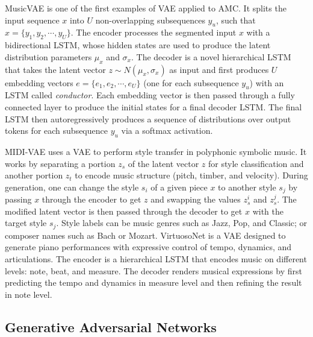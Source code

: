 MusicVAE \cite{Roberts2017} is one of the first examples of VAE applied to AMC. It splits the input sequence $x$ into $U$ non-overlapping subsequences $y_u$, such that $x = \{y_1, y_2, \cdots, y_U\}$. The encoder processes the segmented input $x$ with a bidirectional LSTM, whose hidden states are used to produce the latent distribution parameters $\mu_x$ and $\sigma_x$. The decoder is a novel hierarchical LSTM that takes the latent vector $z \sim N(\mu_x, \sigma_x)$ as input and first produces $U$ embedding vectors $e = \{e_1, e_2, \cdots, e_U\}$ (one for each subsequence $y_u$) with an LSTM called \textit{conductor}. Each embedding vector is then passed through a  fully connected layer to produce the initial states for a final decoder LSTM. The final LSTM then autoregressively produces a sequence of distributions over output tokens for each subsequence $y_u$ via a softmax activation.

MIDI-VAE \cite{brunner2018midi} uses a VAE to perform style transfer in polyphonic symbolic music. It works by separating a portion $z_s$ of the latent vector $z$ for style classification and another portion $z_t$ to encode music structure (pitch, timber, and velocity). During generation, one can change the style $s_i$ of a given piece $x$ to another style $s_j$ by passing $x$ through the encoder to get $z$ and swapping the values $z_s^i$ and $z_s^j$. The modified latent vector is then passed through the decoder to get $x$ with the target style $s_j$. Style labels can be music genres such as Jazz, Pop, and Classic; or composer names such as Bach or Mozart.
VirtuosoNet \cite{jeong2019virtuosonet} is a VAE designed to generate piano performances with expressive control of tempo, dynamics, and articulations. The encoder is a hierarchical LSTM that encodes music on different levels: note, beat, and measure. The decoder renders musical expressions by first predicting the tempo and dynamics in measure level and then refining the result in note level.

\subsection{Generative Adversarial Networks}


